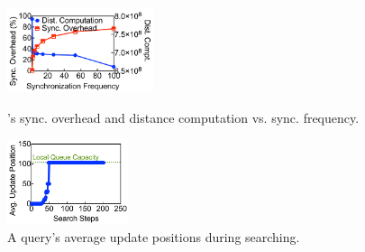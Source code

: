 \begin{figure}[t]
    \begin{minipage}[t]{0.23\textwidth}
        \centering
        \includegraphics[height=0.98in]{submissions/Minjia2023/figures/insight_PSS_sync_frequency_vs_overhead}
        \caption{\Hammer's sync. overhead and distance computation vs. sync. frequency.}
        \label{minjia_fig:insight_PSS_sync_frequency_vs_overhead}
    \end{minipage}
    \hfill
    \begin{minipage}[t]{0.23\textwidth}
        \centering
        \includegraphics[height=0.98in]{submissions/Minjia2023/figures/insight_PSS_update_position_example}
        \caption{A query's average update positions during searching.
        }
        \label{minjia_fig:insight_PSS_update_position_example}
    \end{minipage}
\end{figure}







